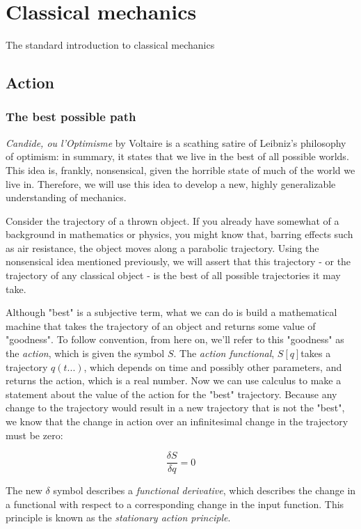 \chapter{Classical mechanics}

The standard introduction to classical mechanics

\section{Action}

\subsection{The best possible path}

\textit{Candide, ou l'Optimisme} by Voltaire is a scathing satire of Leibniz's philosophy of 
optimism: in summary, it states that we live in the best of all possible worlds. This idea is,
frankly, nonsensical, given the horrible state of much of the world we live in. Therefore, we will
use this idea to develop a new, highly generalizable understanding of mechanics.

Consider the trajectory of a thrown object. If you already have somewhat of a background in
mathematics or physics, you might know that, barring effects such as air resistance, the object
moves along a parabolic trajectory. Using the nonsensical idea mentioned previously, we will assert
that this trajectory - or the trajectory of any classical object - is the best of all possible
trajectories it may take.

Although "best" is a subjective term, what we can do is build a mathematical machine that takes the
trajectory of an object and returns some value of "goodness". To follow convention, from here on,
we'll refer to this "goodness" as the \textit{action}, which is given the symbol $S$. The
\textit{action functional}, $S\left[q\right]$takes a trajectory $q\left(t...\right)$, which depends
on time and possibly other parameters, and returns the action, which is a real number. Now we can
use calculus to make a statement about the value of the action for the "best" trajectory. Because
any change to the trajectory would result in a new trajectory that is not the "best", we know that
the change in action over an infinitesimal change in the trajectory must be zero:

$$\frac{\delta S}{\delta q} = 0$$

The new $\delta$ symbol describes a \textit{functional derivative}, which describes the change in a
functional with respect to a corresponding change in the input function. This principle is known as
the \textit{stationary action principle}.

